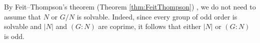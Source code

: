 By Feit--Thompson's theorem (Theorem \ref{thm:FeitThompson}) , we do not need to assume that
$N$ or $G/N$ is solvable. Indeed, since every group of odd order is solvable and
$|N|$ and $(G:N)$ are coprime, it follows that either $|N|$ or $(G:N)$ is odd. 


%

%
%
%
%	
